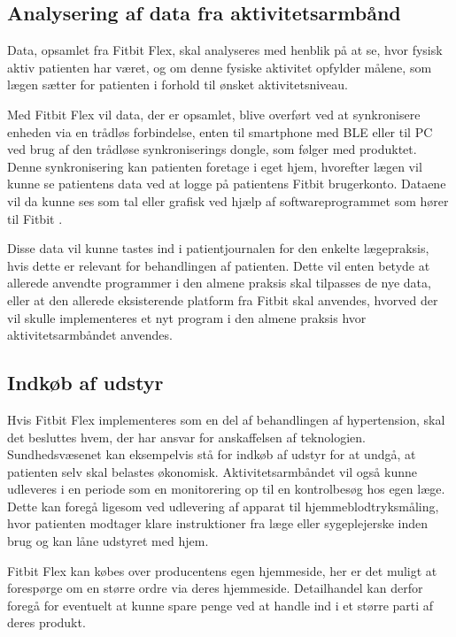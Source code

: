 \subsection{Analysering af data fra aktivitetsarmbånd}  
Data, opsamlet fra Fitbit Flex, skal analyseres med henblik på at se, hvor fysisk aktiv patienten har været, og om denne fysiske aktivitet opfylder målene, som lægen sætter for patienten i forhold til ønsket aktivitetsniveau. 

Med Fitbit Flex vil data, der er opsamlet, blive overført ved at synkronisere enheden via en trådløs forbindelse, enten til smartphone med BLE eller til PC ved brug af den trådløse synkroniserings dongle, som følger med produktet. Denne synkronisering kan patienten foretage i eget hjem, hvorefter lægen vil kunne se patientens data  ved at logge på patientens Fitbit brugerkonto. Dataene vil da kunne ses som tal eller grafisk ved hjælp af softwareprogrammet som hører til Fitbit \citep{fitbitflex}. 

Disse data vil kunne tastes ind i patientjournalen for den enkelte lægepraksis, hvis dette er relevant for behandlingen af patienten. Dette vil enten betyde at allerede anvendte programmer i den almene praksis skal tilpasses de nye data, eller at den allerede eksisterende platform fra Fitbit skal anvendes, hvorved der vil skulle implementeres et nyt program i den almene praksis hvor aktivitetsarmbåndet anvendes. 

\subsection{Indkøb af udstyr}	

Hvis Fitbit Flex implementeres som en del af behandlingen af hypertension, skal det besluttes hvem, der har ansvar for anskaffelsen af teknologien. Sundhedsvæsenet kan eksempelvis stå for indkøb af udstyr for at undgå, at patienten selv skal belastes økonomisk. Aktivitetsarmbåndet vil også kunne udleveres i en periode som en monitorering op til en kontrolbesøg hos egen læge. Dette kan foregå ligesom ved udlevering af apparat til hjemmeblodtryksmåling, hvor patienten modtager klare instruktioner fra læge eller sygeplejerske inden brug og kan låne udstyret med hjem.

Fitbit Flex kan købes over producentens egen hjemmeside, her er det muligt at forespørge om en større ordre via deres hjemmeside. Detailhandel kan derfor foregå for eventuelt at kunne spare penge ved at handle ind i et større parti af deres produkt.

